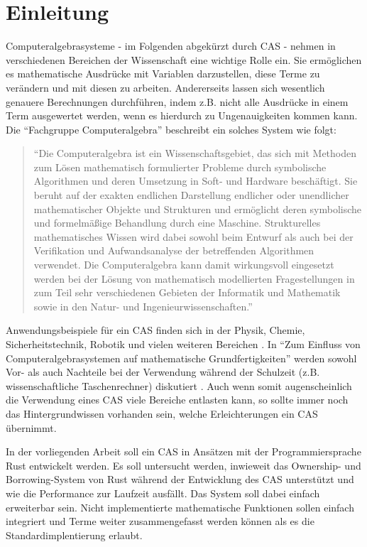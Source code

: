 \documentclass[11pt,a4paper, ngerman]{article}
\begin{document}
\section{Einleitung}
Computeralgebrasysteme - im Folgenden abgekürzt durch CAS - nehmen in verschiedenen Bereichen der Wissenschaft eine wichtige Rolle ein. Sie ermöglichen es mathematische Ausdrücke mit Variablen darzustellen, diese Terme zu verändern und mit diesen zu arbeiten. Andererseits lassen sich wesentlich genauere Berechnungen durchführen, indem z.B. nicht alle Ausdrücke in einem Term ausgewertet werden, wenn es hierdurch zu Ungenauigkeiten kommen kann. Die ``Fachgruppe Computeralgebra'' beschreibt ein solches System wie folgt:
\begin{quote}
    ``Die Computeralgebra ist ein Wissenschaftsgebiet, das sich mit Methoden zum Lösen mathematisch formulierter Probleme durch symbolische Algorithmen und deren Umsetzung in Soft- und Hardware beschäftigt. Sie beruht auf der exakten endlichen Darstellung endlicher oder unendlicher mathematischer Objekte und Strukturen und ermöglicht deren symbolische und formelmäßige Behandlung durch eine Maschine. Strukturelles mathematisches Wissen wird dabei sowohl beim Entwurf als auch bei der Verifikation und Aufwandsanalyse der betreffenden Algorithmen verwendet. Die Computeralgebra kann damit wirkungsvoll eingesetzt werden bei der Lösung von mathematisch modellierten Fragestellungen in zum Teil sehr verschiedenen Gebieten der Informatik und Mathematik sowie in den Natur- und Ingenieurwissenschaften.'' \cite{FachgruppeDef}
\end{quote}

Anwendungsbeispiele für ein CAS finden sich in der Physik, Chemie, Sicherheitstechnik, Robotik und vielen weiteren Bereichen \cite{FachgruppeEinsatz}. In ``Zum Einfluss von Computeralgebrasystemen auf mathematische Grundfertigkeiten'' werden sowohl Vor- als auch Nachteile bei der Verwendung während der Schulzeit (z.B. wissenschaftliche Taschenrechner) diskutiert \cite[S. 17 ff.]{RN18}. Auch wenn somit augenscheinlich die Verwendung eines CAS viele Bereiche entlasten kann, so sollte immer noch das Hintergrundwissen vorhanden sein, welche Erleichterungen ein CAS übernimmt.

In der vorliegenden Arbeit soll ein CAS in Ansätzen mit der Programmiersprache Rust entwickelt werden. Es soll untersucht werden, inwieweit das Ownership- und Borrowing-System von Rust während der Entwicklung des CAS unterstützt und wie die Performance zur Laufzeit ausfällt. Das System soll dabei einfach erweiterbar sein. Nicht implementierte mathematische Funktionen sollen einfach integriert und Terme weiter zusammengefasst werden können als es die Standardimplentierung erlaubt.
\end{document}
